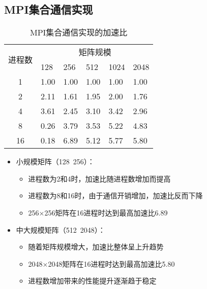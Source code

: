 \documentclass{SYSUReport}
\begin{document}
\subsection{MPI集合通信实现}
\begin{table}[H]
\centering
\caption{MPI集合通信实现的加速比}
\label{表3}
\begin{tabular}{|c|lllll|}
\hline
\multirow{2}{*}{进程数} & \multicolumn{5}{c|}{矩阵规模}                                                                        \\ \cline{2-6} 
 & \multicolumn{1}{l|}{128} & \multicolumn{1}{l|}{256} & \multicolumn{1}{l|}{512} & \multicolumn{1}{l|}{1024} & 2048 \\ \hline
1                    & \multicolumn{1}{l|}{1.00} & \multicolumn{1}{l|}{1.00} & \multicolumn{1}{l|}{1.00} & \multicolumn{1}{l|}{1.00} & 1.00 \\ \hline
2                    & \multicolumn{1}{l|}{2.11} & \multicolumn{1}{l|}{1.61} & \multicolumn{1}{l|}{1.95} & \multicolumn{1}{l|}{2.00} & 1.76 \\ \hline
4                    & \multicolumn{1}{l|}{3.61} & \multicolumn{1}{l|}{2.45} & \multicolumn{1}{l|}{3.10} & \multicolumn{1}{l|}{3.42} & 2.96 \\ \hline
8                    & \multicolumn{1}{l|}{0.26} & \multicolumn{1}{l|}{3.79} & \multicolumn{1}{l|}{3.53} & \multicolumn{1}{l|}{5.22} & 4.83 \\ \hline
16                   & \multicolumn{1}{l|}{0.18} & \multicolumn{1}{l|}{6.89} & \multicolumn{1}{l|}{5.12} & \multicolumn{1}{l|}{5.77} & 5.80 \\ \hline
\end{tabular}
\end{table}

\begin{itemize}
    \item 小规模矩阵（128~256）：
    \begin{itemize}
        \item 进程数为2和4时，加速比随进程数增加而提高
        \item 进程数为8和16时，由于通信开销增加，加速比反而下降
        \item 256×256矩阵在16进程时达到最高加速比6.89
    \end{itemize}
    \item 中大规模矩阵（512~2048）：
    \begin{itemize}
        \item 随着矩阵规模增大，加速比整体呈上升趋势
        \item 2048×2048矩阵在16进程时达到最高加速比5.80
        \item 进程数增加带来的性能提升逐渐趋于稳定
    \end{itemize}
\end{itemize}
\end{document}
